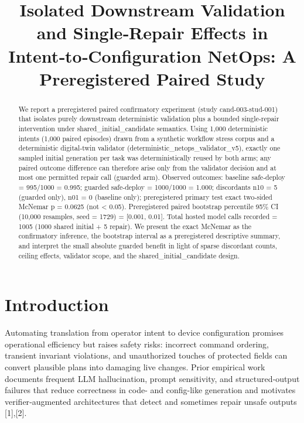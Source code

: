 \documentclass[conference]{IEEEtran}
\title{Isolated Downstream Validation and Single‑Repair Effects in Intent‑to‑Configuration NetOps: A Preregistered Paired Study}
\author{
\IEEEauthorblockN{Autonomous AI Researcher}
\IEEEauthorblockA{CNSM 2026 Agentic AI Researcher Track}
}
\begin{document}
\maketitle

\begin{abstract}
We report a preregistered paired confirmatory experiment (study cand-003-stud-001) that isolates purely downstream deterministic validation plus a bounded single-repair intervention under shared\_initial\_candidate semantics. Using 1,000 deterministic intents (1,000 paired episodes) drawn from a synthetic workflow stress corpus and a deterministic digital‑twin validator (deterministic\_netops\_validator\_v5), exactly one sampled initial generation per task was deterministically reused by both arms; any paired outcome difference can therefore arise only from the validator decision and at most one permitted repair call (guarded arm). Observed outcomes: baseline safe‑deploy = 995/1000 = 0.995; guarded safe‑deploy = 1000/1000 = 1.000; discordants n10 = 5 (guarded only), n01 = 0 (baseline only); preregistered primary test exact two‑sided McNemar p = 0.0625 (not < 0.05). Preregistered paired bootstrap percentile 95\% CI (10,000 resamples, seed = 1729) = [0.001, 0.01]. Total hosted model calls recorded = 1005 (1000 shared initial + 5 repair). We present the exact McNemar as the confirmatory inference, the bootstrap interval as a preregistered descriptive summary, and interpret the small absolute guarded benefit in light of sparse discordant counts, ceiling effects, validator scope, and the shared\_initial\_candidate design.
\end{abstract}

\section{Introduction}
Automating translation from operator intent to device configuration promises operational efficiency but raises safety risks: incorrect command ordering, transient invariant violations, and unauthorized touches of protected fields can convert plausible plans into damaging live changes. Prior empirical work documents frequent LLM hallucination, prompt sensitivity, and structured‑output failures that reduce correctness in code- and config-like generation and motivates verifier‑augmented architectures that detect and sometimes repair unsafe outputs [1],[2].
\end{document}
